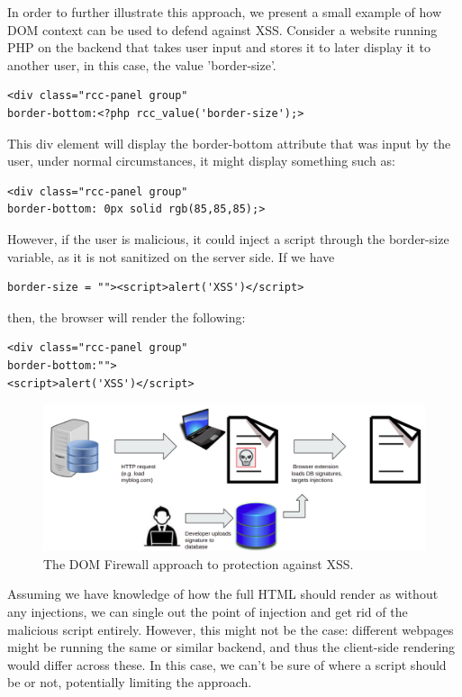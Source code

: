 In order to further illustrate this approach, we present a small example of how DOM context can be used to defend against XSS. Consider a website running PHP on the backend that takes user input and stores it to later display it to another user, in this case, the value 'border-size'.
\\
\begin{lstlisting}
<div class="rcc-panel group" 
border-bottom:<?php rcc_value('border-size');>
\end{lstlisting}
This div element will display the border-bottom attribute that was input by the user, under normal circumstances, it might display something such as: 
\begin{lstlisting}
<div class="rcc-panel group" 
border-bottom: 0px solid rgb(85,85,85);>
\end{lstlisting}
However, if the user is malicious, it could inject a script through the border-size variable, as it is not sanitized on the server side. If we have
\begin{lstlisting}
border-size = ""><script>alert('XSS')</script>
\end{lstlisting}
then, the browser will render the following:
\begin{lstlisting}
<div class="rcc-panel group" 
border-bottom:"">
<script>alert('XSS')</script>
\end{lstlisting}
\begin{figure}[h]
	\includegraphics[scale=0.23]{img/dom_firewall.png}
	\caption{The DOM Firewall approach to protection against XSS.}
	\label{fig:dom_firewall}
\end{figure}
Assuming we have knowledge of how the full HTML should render as without any injections, we can single out the point of injection and get rid of the malicious script entirely. However, this might not be the case: different webpages might be running the same or similar backend, and thus the client-side rendering would differ across these. In this case, we can't be sure of where a script should be or not, potentially limiting the approach.

